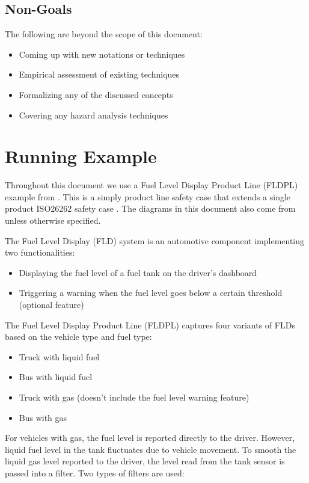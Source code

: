 \documentclass[11pt]{article}
\begin{document}
\subsection{Non-Goals} 

The following are beyond the scope of this document:

\begin{itemize}
\item Coming up with new notations or techniques
\item Empirical assessment of existing techniques
\item Formalizing any of the discussed concepts
\item Covering any hazard analysis techniques
\end{itemize}

\section{Running Example}

Throughout this document we use a Fuel Level Display Product Line (FLDPL) example from \cite{Gallucci_2013}. This is a simply product line safety case that extends a single product ISO26262 safety case \cite{Dardar_2014}. The diagrams in this document also come from \cite{Gallucci_2013} unless otherwise specified.

The Fuel Level Display (FLD) system is an automotive component implementing two functionalities:

\begin{itemize}
\item Displaying the fuel level of a fuel tank on the driver's dashboard
\item Triggering a warning when the fuel level goes below a certain threshold (optional feature)
\end{itemize}

The Fuel Level Display Product Line (FLDPL) captures four variants of FLDs based on the vehicle type and fuel type:

\begin{itemize}
\item Truck with liquid fuel
\item Bus with liquid fuel
\item Truck with gas (doesn't include the fuel level warning feature)
\item Bus with gas
\end{itemize}

For vehicles with gas, the fuel level is reported directly to the driver. However, liquid fuel level in the tank fluctuates due to vehicle movement. To smooth the liquid gas level reported to the driver, the level read from the tank sensor is passed into a filter. Two types of filters are used:
\end{document}

